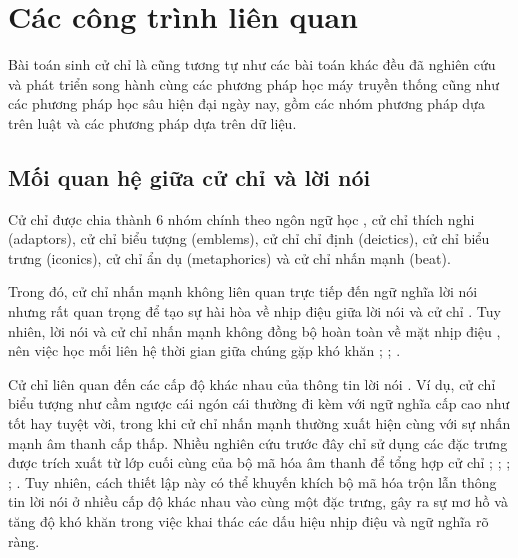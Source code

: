 \chapter{Các công trình liên quan}
\label{Chapter2}

Bài toán sinh cử chỉ là cũng tương tự như các bài toán khác đều đã nghiên cứu và phát triển song hành cùng các phương pháp học máy truyền thống cũng như các phương pháp học sâu hiện đại ngày nay, gồm các nhóm phương pháp dựa trên luật và các phương pháp dựa trên dữ liệu. 

\section{Mối quan hệ giữa cử chỉ và lời nói}

Cử chỉ được chia thành 6 nhóm chính theo ngôn ngữ  học \cite{ekman1969repertoire}, \cite{sebeok2011advances} cử chỉ thích nghi (adaptors), cử chỉ biểu tượng (emblems), cử chỉ chỉ định (deictics), cử chỉ biểu trưng (iconics), cử chỉ ẩn dụ (metaphorics) và cử chỉ nhấn mạnh (beat).

 Trong đó, cử chỉ nhấn mạnh không liên quan trực tiếp đến ngữ nghĩa lời nói \cite{kipp2005gesture} nhưng rất quan trọng để tạo sự hài hòa về nhịp điệu giữa lời nói và cử chỉ  \cite{sebeok2011advances} . Tuy nhiên, lời nói và cử chỉ nhấn mạnh không đồng bộ hoàn toàn về mặt nhịp điệu \cite{mcclave1994gestural}, nên việc học mối liên hệ thời gian giữa chúng gặp khó khăn \cite{bhattacharya2021speech2affectivegestures}; \cite{kucherenko2020gesticulator}; \cite{yoon2020speech}.

Cử chỉ liên quan đến các cấp độ khác nhau của thông tin lời nói \cite{sebeok2011advances}. Ví dụ, cử chỉ biểu tượng như cầm ngược cái ngón cái thường đi kèm với ngữ nghĩa cấp cao như tốt hay tuyệt vời, trong khi cử chỉ nhấn mạnh thường xuất hiện cùng với sự nhấn mạnh âm thanh cấp thấp. Nhiều nghiên cứu trước đây chỉ sử dụng các đặc trưng được trích xuất từ lớp cuối cùng của bộ mã hóa âm thanh để tổng hợp cử chỉ \cite{alexanderson2020style}; \cite{bhattacharya2021speech2affectivegestures}; \cite{kucherenko2021large}; \cite{qian2021speech}; \cite{yoon2022genea}. Tuy nhiên, cách thiết lập này có thể khuyến khích bộ mã hóa trộn lẫn thông tin lời nói ở nhiều cấp độ khác nhau vào cùng một đặc trưng, gây ra sự mơ hồ và tăng độ khó khăn trong việc khai thác các dấu hiệu nhịp điệu và ngữ nghĩa rõ ràng.

